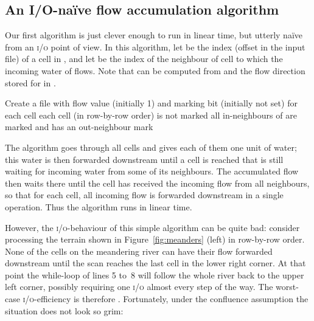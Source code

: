 \documentclass[10pt,a4paper]{article}
\def\io{\textsc{i/o}\xspace}
\begin{document}
\subsection{An I/O-na\"ive flow accumulation algorithm}\label{sec:naiveacc}

Our first algorithm is just clever enough to run in linear time, but utterly na\"ive from an \io point of view.
In this algorithm, let  be the index (offset in the input file) of a cell in , and let  be the index of the neighbour of cell  to which the incoming water of  flows. Note that  can be computed from  and the flow direction stored for  in .

\begin{codebox}
\Procname{}
\li Create a file  with flow value (initially 1) and marking bit (initially not set) for each cell
\li \For each cell  (in row-by-row order)
\li \Do  \If  is not marked
\li      \Then  
\li             \While all in-neighbours of  are marked and  has an out-neighbour 
\li             \Do    mark 
\li                    
\li                    
                \End
         \End
    \End
\end{codebox}

The algorithm goes through all cells and gives each of them one unit of water; this water is then forwarded downstream until a cell is reached that is still waiting for incoming water from some of its neighbours. The accumulated flow then waits there until the cell has received the incoming flow from all neighbours, so that for each cell, all incoming flow is forwarded downstream in a single operation. Thus the algorithm runs in linear time.

However, the \io-behaviour of this simple algorithm can be quite bad: consider processing the terrain shown in Figure~\ref{fig:meanders} (left) in row-by-row order. None of the cells on the meandering river can have their flow forwarded downstream until the scan reaches the last cell in the lower right corner. At that point the while-loop of lines 5 to~8 will follow the whole river back to the upper left corner, possibly requiring one \io almost every step of the way. The worst-case \io-efficiency is therefore . Fortunately, under the confluence assumption the situation does not look so grim:
\end{document}
